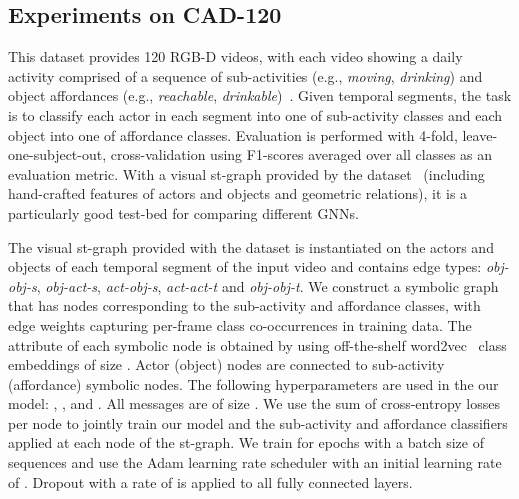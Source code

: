 \documentclass[runningheads]{llncs}
\begin{document}
\subsection{Experiments on CAD-120}
\label{subsec:cad120}
 This dataset provides 120 RGB-D videos, with each video showing a daily activity comprised of a sequence of sub-activities (e.g., \emph{moving}, \emph{drinking}) and object affordances (e.g., \emph{reachable}, \emph{drinkable})~\cite{Koppula:IJRR13}. Given temporal segments, the task is to classify each actor in each segment into one of  sub-activity classes and each object into one of  affordance classes. Evaluation is performed with 4-fold, leave-one-subject-out, cross-validation using F1-scores averaged over all classes as an evaluation metric.  With a visual st-graph provided by the dataset~\cite{Koppula:IJRR13} (including hand-crafted features of actors and objects and geometric relations), it is a particularly good test-bed for comparing different GNNs.

The visual st-graph provided with the dataset is instantiated on the actors and objects of each temporal segment of the input video and contains  edge types: \emph{obj-obj-s}, \emph{obj-act-s}, \emph{act-obj-s}, \emph{act-act-t} and \emph{obj-obj-t}. We construct a symbolic graph that has nodes corresponding to the  sub-activity and  affordance classes, with edge weights capturing per-frame class co-occurrences in training data. The attribute of each symbolic node is obtained by using off-the-shelf word2vec~\cite{Mikolov:NIPS13} class embeddings of size . Actor (object) nodes are connected to sub-activity (affordance) symbolic nodes.
The following hyperparameters are used in the our model: , ,  and . All messages are of size .
We use the sum of cross-entropy losses per node to jointly train our model and the sub-activity and affordance classifiers applied at each node of the st-graph. We train for  epochs with a batch size of  sequences and use the Adam learning rate scheduler with an initial learning rate of . Dropout with a rate of  is applied to all fully connected layers.
\end{document}
